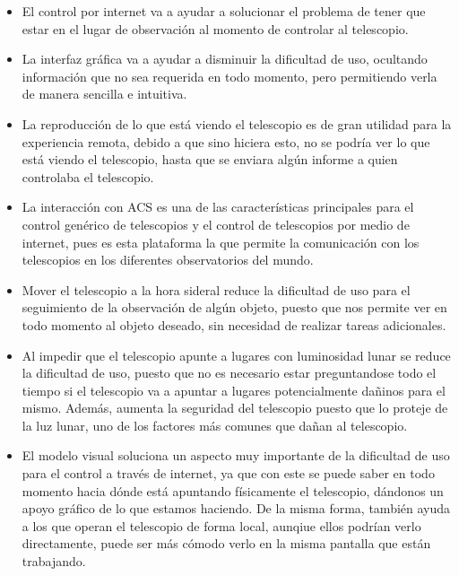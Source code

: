 \documentclass[letterpaper,spanish,10pt]{article}
\begin{document}
	\begin{itemize}

	\item El control por internet va a ayudar a solucionar el problema de tener 
que estar en el lugar de observaci\'on al momento de controlar al telescopio.

	\item La interfaz gr\'afica va a ayudar a disminuir la dificultad de uso, 
ocultando informaci\'on que no sea requerida en todo momento, pero permitiendo 
verla de manera sencilla e intuitiva.

	\item La reproducci\'on de lo que est\'a viendo el telescopio es de gran 
utilidad para la experiencia remota, debido a que sino hiciera esto, no se podr\'ia 
ver lo que est\'a viendo el telescopio, hasta que se enviara alg\'un informe a 
quien controlaba el telescopio.

	\item La interacci\'on con ACS es una de las caracter\'isticas principales 
para el control gen\'erico de telescopios y el control de telescopios por medio 
de internet, pues es esta plataforma la que permite la comunicaci\'on con los 
telescopios en los diferentes observatorios del mundo.

	\item Mover el telescopio a la hora sideral reduce la dificultad de uso 
para el seguimiento de la observaci\'on de alg\'un objeto, puesto que nos permite 
ver en todo momento al objeto deseado, sin necesidad de realizar tareas adicionales.

	\item Al impedir que el telescopio apunte a lugares con luminosidad lunar 
se reduce la dificultad de uso, puesto que no es necesario estar preguntandose 
todo el tiempo si el telescopio va a apuntar a lugares potencialmente da\~ninos 
para el mismo. Adem\'as, aumenta la seguridad del telescopio puesto que lo proteje 
de la luz lunar, uno de los factores m\'as comunes que da\~nan al telescopio.

	\item El modelo visual soluciona un aspecto muy importante de la dificultad 
de uso para el control a trav\'es de internet, ya que con este se puede saber en 
todo momento hacia d\'onde est\'a apuntando f\'isicamente el telescopio, d\'andonos 
un apoyo gr\'afico de lo que estamos haciendo. De la misma forma, tambi\'en ayuda 
a los que operan el telescopio de forma local, aunqiue ellos podr\'ian verlo 
directamente, puede ser m\'as c\'omodo verlo en la misma pantalla que est\'an trabajando.


\end{itemize}
\end{document}
